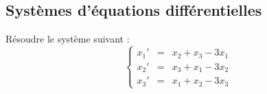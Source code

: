\documentclass[a4paper,twoside,french,11pt]{VcCours}
\begin{document}
%
%
%


\subsection{Systèmes d'équations différentielles}


\begin{Exercice}{} Résoudre le système suivant :
$$\left\{\begin{array}{rcl}
x_1' & = & x_2 + x_3 - 3x_1 \\
x_2' & = & x_3 + x_1 -3 x_2 \\
x_3' &= & x_1 + x_2 -3 x_3\end{array}\right.$$
\end{Exercice}
\end{document}
